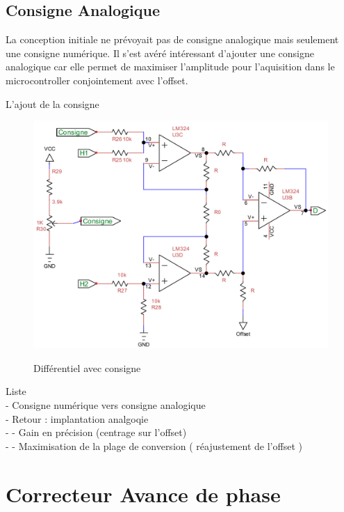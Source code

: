 \documentclass[11pt, french]{article} %
\begin{document}
\subsection{Consigne Analogique}
La conception initiale ne prévoyait pas de consigne analogique mais seulement une consigne numérique. Il s'est avéré intéressant d'ajouter une consigne analogique car elle permet de maximiser l'amplitude pour l'aquisition dans le microcontroller conjointement avec l'offset.

L'ajout de la consigne 

\begin{figure}[h!]
  \includegraphics{SolutionAnalogique/AmpInstCons}
  \label{}
  \caption{Différentiel avec consigne}
\end{figure}

Liste
\\- Consigne numérique vers consigne analogique
\\- Retour : implantation analgoqie
\\- - Gain en précision (centrage sur l'offset)
\\- - Maximisation de la plage de conversion ( réajustement de l'offset )




\section{Correcteur Avance de phase}
\end{document}
